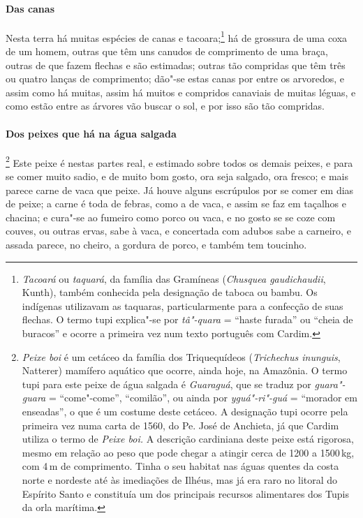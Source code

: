 \paragraph{Das canas}

Nesta terra há muitas espécies de canas e tacoara;\footnote{ \textit{Tacoará} 
ou \textit{taquará}, da família das Gramíneas
(\textit{Chusquea gaudichaudii}, Kunth), também conhecida pela
designação de taboca ou bambu. Os indígenas utilizavam as taquaras,
particularmente para a confecção de suas flechas. O termo tupi
explica"-se por \textit{tâ"-quara} = ``haste furada'' ou ``cheia de buracos''
e ocorre a primeira vez num texto português com Cardim.} há de grossura
de uma coxa de um homem, outras que têm uns canudos de comprimento de
uma braça, outras de que fazem flechas e são estimadas; outras tão
compridas que têm três ou quatro lanças de comprimento; dão"-se estas
canas por entre os arvoredos, e assim como há muitas, assim há muitos e
compridos canaviais de muitas léguas, e como estão entre as árvores vão
buscar o sol, e por isso são tão compridas.

\paragraph{Dos peixes que há na água salgada}

\footnote{ \textit{Peixe boi} é um cetáceo da
família dos Triquequídeos (\textit{Trichechus inunguis}, Natterer)
mamífero aquático que ocorre, ainda hoje, na Amazônia. O termo tupi
para este peixe de água salgada é \textit{Guaraguá}, que se
traduz por \textit{guara"-guara} = ``come"-come'', ``comilão'', ou ainda
por \textit{yguá"-ri"-guá} = ``morador em enseadas'', o que é um costume
deste cetáceo. A designação tupi ocorre pela primeira vez numa carta 
de 1560, do Pe. José de Anchieta, já que Cardim utiliza o termo
de \textit{Peixe boi.} A descrição cardiniana deste peixe está
rigorosa, mesmo em relação ao peso que pode chegar a atingir cerca de
1200 a 1500\,kg, com 4\,m de comprimento. Tinha o seu habitat nas águas
quentes da costa norte e nordeste até às imediações de Ilhéus, mas já
era raro no litoral do Espírito Santo e constituía um dos principais
recursos alimentares dos Tupis da orla marítima.} Este
peixe é nestas partes real, e estimado sobre todos os demais peixes, e
para se comer muito sadio, e de muito bom gosto, ora seja salgado, ora
fresco; e mais parece carne de vaca que peixe. Já houve alguns
escrúpulos por se comer em dias de peixe; a carne é toda de febras,
como a de vaca, e assim se faz em taçalhos e chacina; e cura"-se ao
fumeiro como porco ou vaca, e no gosto se se coze com couves, ou outras
ervas, sabe à vaca, e concertada com adubos sabe a carneiro, e assada
parece, no cheiro, a gordura de porco, e também tem toucinho.

